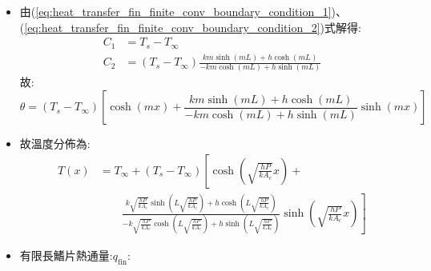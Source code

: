 \documentclass[../main.tex]{subfiles}
\begin{document}
\begin{itemize}
\begin{itemize}
\begin{itemize}
\begin{itemize}
\begin{align}
            m \cosh(mx)
          \right] \nonumber\\
          \Rightarrow\quad& \frac{dT}{dx}\bigg|_{x=L} = (T_s - T_\infty) \left[
            m \sinh(mL)
          \right] + C_2 \left[
            m \cosh(mL)
          \right] \nonumber\\
          \Rightarrow\quad& -kA_c \left[
            (T_s - T_\infty) m \sinh(mL) + C_2 m \cosh(mL)
          \right] = \nonumber \\
          &\quad\quad h A_c \left[
            C_1 \cosh(mL) + C_2 \sinh(mL)
          \right] \nonumber\\
          \Rightarrow\quad& C_2 = (T_s - T_\infty) \frac{
            k m \sinh(mL) + h \cosh(mL)
          }{
            -k m \cosh(mL) + h \sinh(mL)
          } \label{eq:heat_transfer_fin_finite_conv_boundary_condition_2}
        \end{align} 
      \end{itemize}
    \item 由(\ref{eq:heat_transfer_fin_finite_conv_boundary_condition_1})、(\ref{eq:heat_transfer_fin_finite_conv_boundary_condition_2})式解得:
    \begin{align}
      C_1 &= T_s - T_\infty \nonumber\\
      C_2 &= (T_s - T_\infty) \frac{
        k m \sinh(mL) + h \cosh(mL)
      }{
        -k m \cosh(mL) + h \sinh(mL)
      }
    \end{align}
    故:
    \begin{equation}
      \theta = (T_s - T_\infty) \left[
        \cosh(mx) + \frac{
          k m \sinh(mL) + h \cosh(mL)
        }{
          -k m \cosh(mL) + h \sinh(mL)
        } \sinh(mx)
      \right]
    \end{equation}
    \item 故溫度分佈為:
    \begin{align}
      T(x) &= T_\infty + (T_s - T_\infty) \left[
        \cosh\left(\sqrt{\frac{hP}{kA_c}}x\right) + \right. \nonumber\\
        &\quad \quad \left. \frac{
          k \sqrt{\frac{hP}{kA_c}} \sinh\left(L\sqrt{\frac{hP}{kA_c}}\right) + h \cosh\left(L\sqrt{\frac{hP}{kA_c}}\right)
        }{
          -k \sqrt{\frac{hP}{kA_c}} \cosh\left(L\sqrt{\frac{hP}{kA_c}}\right) + h \sinh\left(L\sqrt{\frac{hP}{kA_c}}\right)
        } \sinh\left(\sqrt{\frac{hP}{kA_c}}x\right)
      \right] \label{eq:heat_transfer_fin_finite_conv_temperature_distribution}
    \end{align}
    \item 有限長鰭片熱通量:$q_\text{fin}$:

\end{itemize}
\end{itemize}
\end{itemize}
\end{document}
